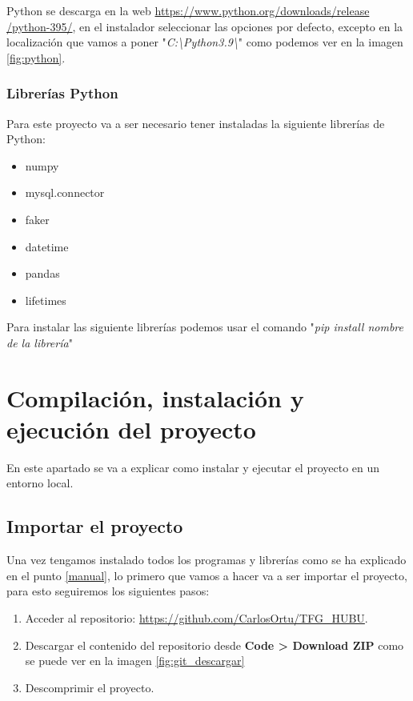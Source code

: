 Python se descarga en la web \href{https://www.python.org/downloads/release/python-395/}{https://www.python.org/downloads/release\\/python-395/}, en el instalador seleccionar las opciones por defecto, excepto en la localización que vamos a poner "\textit{C:\textbackslash{}Python3.9\textbackslash{}}"{} como podemos ver en la imagen \ref{fig:python}.

\newpage

\subsubsection{Librerías Python}

Para este proyecto va a ser necesario tener instaladas la siguiente librerías de Python:
\begin{itemize}
    \item numpy
    \item mysql.connector
    \item faker
    \item datetime
    \item pandas
    \item lifetimes
\end{itemize}

Para instalar las siguiente librerías podemos usar el comando "\textit{pip install nombre de la librería}"


\section{Compilación, instalación y ejecución del proyecto} \label{manualProg}

En este apartado se va a explicar como instalar y ejecutar el proyecto en un entorno local.

\subsection{Importar el proyecto}

Una vez tengamos instalado todos los programas y librerías como se ha explicado en el punto \ref{manual}, lo primero que vamos a hacer va a ser importar el proyecto, para esto seguiremos los siguientes pasos:

\begin{enumerate}
    \item Acceder al repositorio: \href{https://github.com/CarlosOrtu/TFG_HUBU}{https://github.com/CarlosOrtu/TFG\_HUBU}.
    \item Descargar el contenido del repositorio desde \textbf{Code > Download ZIP} como se puede ver en la imagen \ref{fig:git_descargar}
    \item Descomprimir el proyecto.
\end{enumerate}
    
